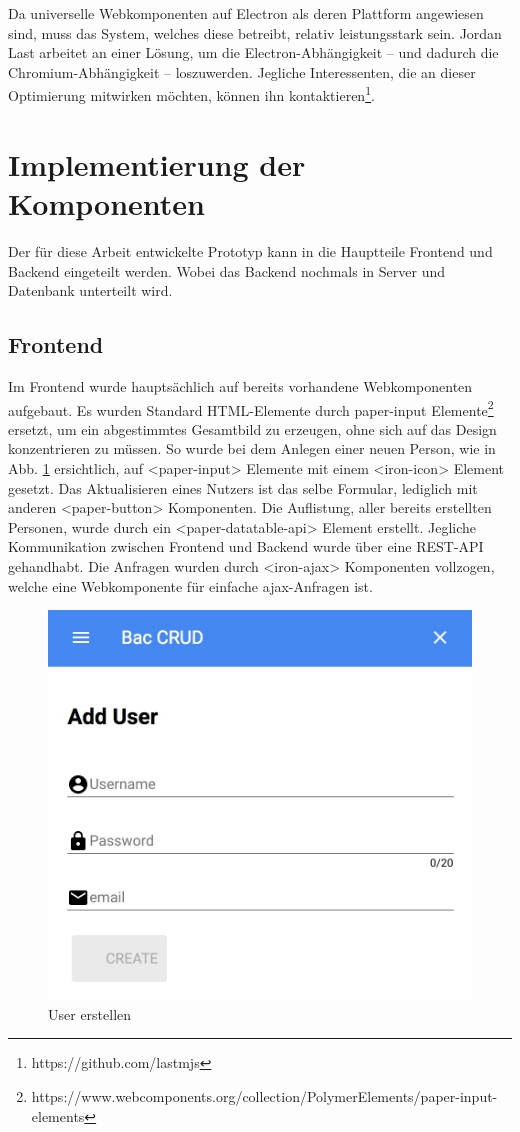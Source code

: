 Da universelle Webkomponenten auf Electron als deren Plattform angewiesen sind, muss das System, welches diese betreibt, relativ leistungsstark sein. Jordan Last arbeitet an einer Lösung, um die Electron-Abhängigkeit -- und dadurch die Chromium-Abhängigkeit -- loszuwerden. Jegliche Interessenten, die an dieser Optimierung mitwirken möchten, können ihn kontaktieren\footnote{https://github.com/lastmjs}.

\section{Implementierung der Komponenten}
Der für diese Arbeit entwickelte Prototyp kann in die Hauptteile Frontend und Backend eingeteilt werden. Wobei das Backend nochmals in Server und Datenbank unterteilt wird. 

\subsection{Frontend}
Im Frontend wurde hauptsächlich auf bereits vorhandene Webkomponenten aufgebaut. Es wurden Standard HTML-Elemente durch paper-input Elemente\footnote{https://www.webcomponents.org/collection/PolymerElements/paper-input-elements} ersetzt, um ein abgestimmtes Gesamtbild zu erzeugen, ohne sich auf das Design konzentrieren zu müssen. So wurde bei dem Anlegen einer neuen Person, wie in Abb. \ref{fig:user_create} ersichtlich, auf <paper-input> Elemente mit einem <iron-icon> Element gesetzt. Das Aktualisieren eines Nutzers ist das selbe Formular, lediglich mit anderen <paper-button> Komponenten. Die Auflistung, aller bereits erstellten Personen, wurde durch ein <paper-datatable-api> Element erstellt. Jegliche Kommunikation zwischen Frontend und Backend wurde über eine REST-API gehandhabt. Die Anfragen wurden durch <iron-ajax> Komponenten vollzogen, welche eine Webkomponente für einfache ajax-Anfragen ist.
\begin{figure}
	\centering
	\includegraphics[width=0.5\linewidth]{images/user_create.jpeg}
	\caption{User erstellen}
	\label{fig:user_create}
\end{figure}


